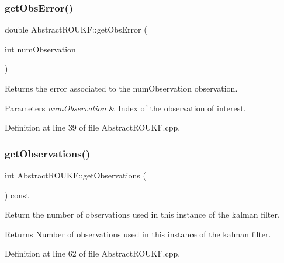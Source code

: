 \mbox{\label{classAbstractROUKF_ae3daccd71ef910705d340567a22abdff}} 
\subsubsection{\texorpdfstring{get\+Obs\+Error()}{getObsError()}}
{\footnotesize\ttfamily double Abstract\+R\+O\+U\+K\+F\+::get\+Obs\+Error (\begin{DoxyParamCaption}\item[{int}]{num\+Observation }\end{DoxyParamCaption})}

Returns the error associated to the {\ttfamily num\+Observation} observation. 
\begin{DoxyParams}{Parameters}
{\em num\+Observation} & Index of the observation of interest. \\
\hline
\end{DoxyParams}


Definition at line 39 of file Abstract\+R\+O\+U\+K\+F.\+cpp.

\mbox{\label{classAbstractROUKF_af26c89f7ed4191cbf41d945808d0daee}} 
\subsubsection{\texorpdfstring{get\+Observations()}{getObservations()}}
{\footnotesize\ttfamily int Abstract\+R\+O\+U\+K\+F\+::get\+Observations (\begin{DoxyParamCaption}{ }\end{DoxyParamCaption}) const}

Return the number of observations used in this instance of the kalman filter. \begin{DoxyReturn}{Returns}
Number of observations used in this instance of the kalman filter. 
\end{DoxyReturn}


Definition at line 62 of file Abstract\+R\+O\+U\+K\+F.\+cpp.

\mbox{\label{classAbstractROUKF_a1fa0b3e17f2618789dca9319bd755830}} 
